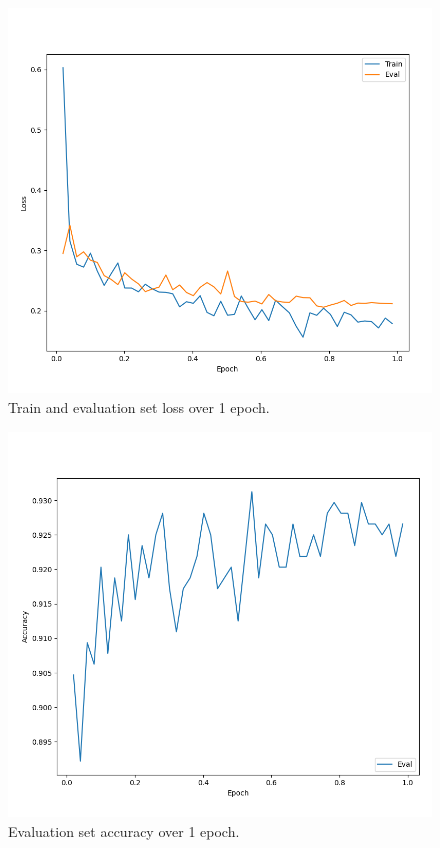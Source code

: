 \documentclass[letterpaper]{article} %
\begin{document}
\begin{figure}[t]
\centering
\includegraphics[width=0.95\columnwidth]{loss.png}
\caption{Train and evaluation set loss over 1 epoch.}
\label{fig1}
\end{figure}

\begin{figure}[t]
\centering
\includegraphics[width=0.95\columnwidth]{accuracy.png}
\caption{Evaluation set accuracy over 1 epoch.}
\label{fig2}
\end{figure}


\end{document}
